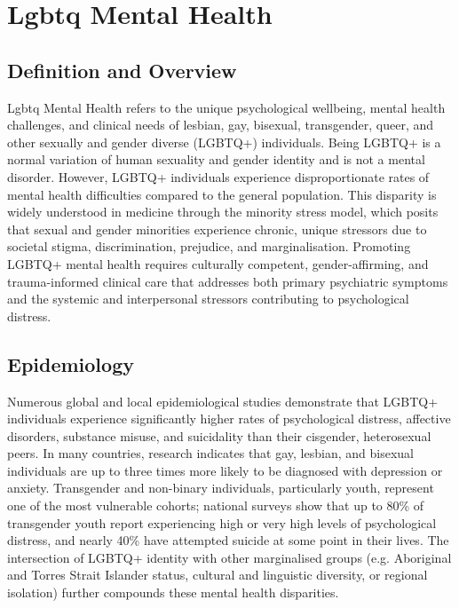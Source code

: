 \chapter{Lgbtq Mental Health}

\section*{Definition and Overview}
Lgbtq Mental Health refers to the unique psychological wellbeing, mental health challenges, and clinical needs of lesbian, gay, bisexual, transgender, queer, and other sexually and gender diverse (LGBTQ+) individuals. Being LGBTQ+ is a normal variation of human sexuality and gender identity and is not a mental disorder. However, LGBTQ+ individuals experience disproportionate rates of mental health difficulties compared to the general population. This disparity is widely understood in medicine through the minority stress model, which posits that sexual and gender minorities experience chronic, unique stressors due to societal stigma, discrimination, prejudice, and marginalisation. Promoting LGBTQ+ mental health requires culturally competent, gender-affirming, and trauma-informed clinical care that addresses both primary psychiatric symptoms and the systemic and interpersonal stressors contributing to psychological distress.

\section*{Epidemiology}
Numerous global and local epidemiological studies demonstrate that LGBTQ+ individuals experience significantly higher rates of psychological distress, affective disorders, substance misuse, and suicidality than their cisgender, heterosexual peers. In many countries, research indicates that gay, lesbian, and bisexual individuals are up to three times more likely to be diagnosed with depression or anxiety. Transgender and non-binary individuals, particularly youth, represent one of the most vulnerable cohorts; national surveys show that up to 80\% of transgender youth report experiencing high or very high levels of psychological distress, and nearly 40\% have attempted suicide at some point in their lives. The intersection of LGBTQ+ identity with other marginalised groups (e.g. Aboriginal and Torres Strait Islander status, cultural and linguistic diversity, or regional isolation) further compounds these mental health disparities.

